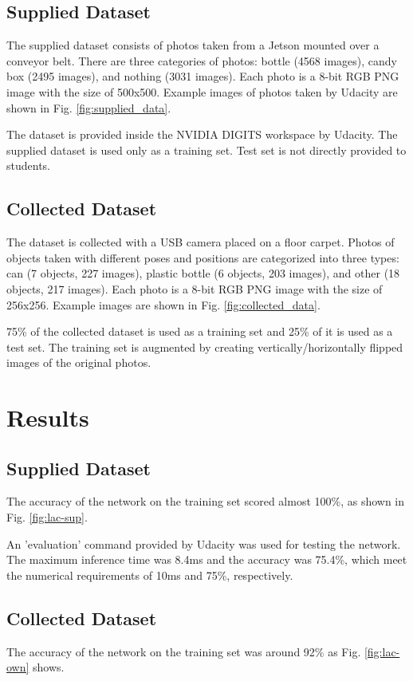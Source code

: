 \documentclass[10pt,journal,compsoc]{IEEEtran}
\begin{document}
\subsection{Supplied Dataset}
The supplied dataset consists of photos taken from a Jetson mounted over a conveyor belt. There are three categories of photos: bottle (4568 images), candy box (2495 images), and nothing (3031 images). Each photo is a 8-bit RGB PNG image with the size of 500x500. Example images of photos taken by Udacity \cite{udacity:supplied_data} are shown in Fig. \ref{fig:supplied_data}.

The dataset is provided inside the NVIDIA DIGITS workspace by Udacity. The supplied dataset is used only as a training set. Test set is not directly provided to students.

\subsection{Collected Dataset}
The dataset is collected with a USB camera placed on a floor carpet. Photos of objects taken with different poses and positions are categorized into three types: can (7 objects, 227 images), plastic bottle (6 objects, 203 images), and other (18 objects, 217 images). 
Each photo is a 8-bit RGB PNG image with the size of 256x256.  Example images  are shown in Fig. \ref{fig:collected_data}.

75\% of the collected dataset is used as a training set and 25\% of it is used as a test set. The training set is augmented by creating vertically/horizontally flipped images of the original photos.

\section{Results}
\subsection{Supplied Dataset}
The accuracy of the network on the training set scored almost 100\%, as shown in Fig. \ref{fig:lac-sup}.

An 'evaluation' command provided by Udacity was used for testing the network. The maximum inference time was 8.4ms and the accuracy was 75.4\%, which meet the numerical requirements of 10ms and 75\%, respectively.

\subsection{Collected Dataset}
The accuracy of the network on the training set was around 92\% as Fig. \ref{fig:lac-own} shows.
\end{document}
